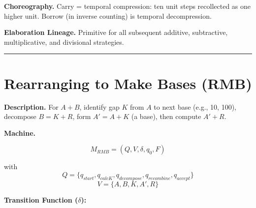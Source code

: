 \documentclass[12pt]{book}
\begin{document}
\textbf{Choreography.} Carry = temporal compression: ten unit steps
recollected as one higher unit. Borrow (in inverse counting) is temporal
decompression.

\textbf{Elaboration Lineage.} Primitive for all subsequent additive,
subtractive, multiplicative, and divisional strategies.

\begin{center}\rule{0.5\linewidth}{0.5pt}\end{center}

\section{Rearranging to Make Bases
(RMB)}\label{rearranging-to-make-bases-rmb}

\textbf{Description.} For \(A + B\), identify gap \(K\) from \(A\) to
next base (e.g., 10, 100), decompose \(B = K + R\), form \(A' = A + K\)
(a base), then compute \(A' + R\).

\textbf{Machine.}

\[M_{RMB} = (Q, V, \delta, q_0, F)\]

with
\[Q = \{q_{start}, q_{calcK}, q_{decompose}, q_{recombine}, q_{accept}\}\]
\[V = \{A, B, K, A', R\}\]

\textbf{Transition Function (\(\delta\)):}
\end{document}
